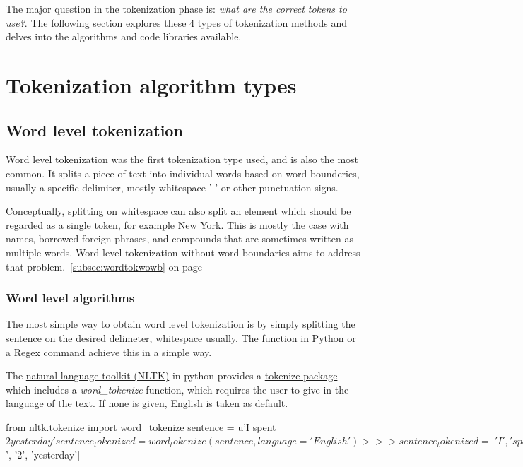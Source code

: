 The major question in the tokenization phase is: \textit{what are the correct tokens to use?}. The following section explores these 4 types of tokenization methods and delves into the algorithms and code libraries available.

\section{Tokenization algorithm types}\label{subsec:toktypes}

\subsection{Word level tokenization}

Word level tokenization was the first tokenization type used, and is also the most common. It splits a piece of text into individual words based on word bounderies, usually a specific delimiter, mostly whitespace ' ' or other punctuation signs.

Conceptually, splitting on whitespace can also split an element which should be regarded as a single token, for example New York. This is mostly the case with names, borrowed foreign phrases, and compounds that are sometimes written as multiple words. Word level tokenization without word boundaries aims to address that problem.~\ref{subsec:wordtokwowb} on page~\pageref{subsec:wordtokwowb}

\subsubsection{Word level algorithms}

The most simple way to obtain word level tokenization is by simply splitting the sentence on the desired delimeter, whitespace usually. The  function in Python or a Regex command  achieve this in a simple way.

The \href{https://www.nltk.org/}{natural language toolkit (NLTK)} in python provides a \href{https://www.nltk.org/api/nltk.tokenize.html}{tokenize package} which includes a \emph{word\_tokenize} function, which requires the user to give in the language of the text. If none is given, English is taken as default.

\begin{python}
from nltk.tokenize import word_tokenize
sentence = u'I spent $2 yesterday'
sentence_tokenized = word_tokenize(sentence, language='English')
>>> sentence_tokenized = ['I', 'spent', '$', '2', 'yesterday']
\end{python}

